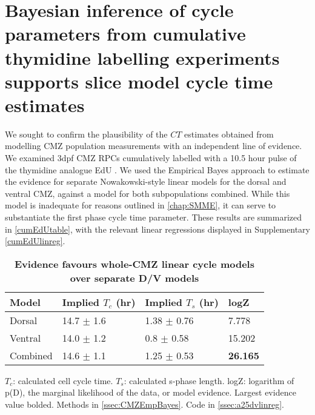\FloatBarrier

\section{Bayesian inference of cycle parameters from cumulative thymidine labelling experiments supports slice model cycle time estimates}
\label{ssec:CMZcumedu}

We sought to confirm the plausibility of the $CT$ estimates obtained from modelling CMZ population measurements with an independent line of evidence. We  examined 3dpf CMZ RPCs cumulatively labelled with a 10.5 hour pulse of the thymidine analogue EdU \cite{Chehrehasa2009}. We used the Empirical Bayes approach to estimate the evidence for separate Nowakowski-style \cite{Nowakowski1989} linear models for the dorsal and ventral CMZ, against a model for both subpopulations combined. While this model is inadequate for reasons outlined in \autoref{chap:SMME}, it can serve to substantiate the first phase cycle time parameter. These results are summarized in \autoref{cumEdUtable}, with the relevant linear regressions displayed in Supplementary \autoref{cumEdUlinreg}.

\begin{table}[!ht]
    \centering
    \caption{{\bf Evidence favours whole-CMZ linear cycle models over separate D/V models}}
    \begin{tabular}{|l|l|l|l|} 
        \hline {\bf Model} & {\bf Implied $T_c$ (hr)} & {\bf Implied $T_s$ (hr)} & {\bf logZ}\\ \hline 
        Dorsal & 14.7 $\pm$ 1.6 & 1.38 $\pm$ 0.76 & 7.778\\ \hline 
        Ventral & 14.0 $\pm$ 1.2 & 0.8 $\pm$ 0.58 & 15.202\\ \hline
        Combined & 14.6 $\pm$ 1.1 & 1.25 $\pm$ 0.53 & {\bf26.165}\\ \hline
    \end{tabular}
   
    \begin{flushleft} $T_c$: calculated cell cycle time. $T_s$: calculated s-phase length. logZ: logarithm of p(D), the marginal likelihood of the data, or model evidence.  Largest evidence value bolded.
    Methods in \autoref{ssec:CMZEmpBayes}.
    Code in \autoref{ssec:a25dvlinreg}.    

    \end{flushleft}
    \label{cumEdUtable}
\end{table}

